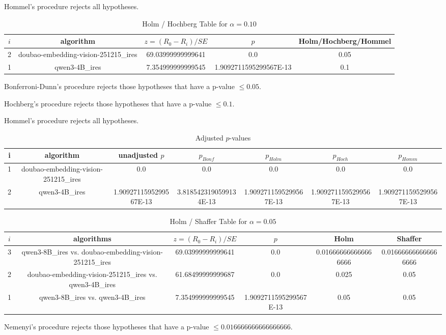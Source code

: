 \documentclass[a4paper,10pt]{article}
\begin{document}
\begin{landscape}
Hommel's procedure rejects all hypotheses.


\begin{table}[!htp]
\centering\tiny
\caption{Holm / Hochberg Table for $\alpha=0.10$}
\begin{tabular}{ccccc}
$i$&algorithm&$z=(R_0 - R_i)/SE$&$p$&Holm/Hochberg/Hommel\\
\hline
2&doubao-embedding-vision-251215_ires&69.03999999999641&0.0&0.05\\
1&qwen3-4B_ires&7.354999999999545&1.9092711595299567E-13&0.1\\
\hline
\end{tabular}
\end{table}
Bonferroni-Dunn's procedure rejects those hypotheses that have a p-value $\le0.05$.


Hochberg's procedure rejects those hypotheses that have a p-value $\le0.1$.


Hommel's procedure rejects all hypotheses.


\begin{table}[!htp]
\centering\tiny
\caption{Adjusted $p$-values}
\begin{tabular}{ccccccc}
i&algorithm&unadjusted $p$&$p_{Bonf}$&$p_{Holm}$&$p_{Hoch}$&$p_{Homm}$\\
\hline
1&doubao-embedding-vision-251215_ires&0.0&0.0&0.0&0.0&0.0\\
2&qwen3-4B_ires&1.9092711595299567E-13&3.8185423190599134E-13&1.9092711595299567E-13&1.9092711595299567E-13&1.9092711595299567E-13\\
\hline
\end{tabular}
\end{table}

\begin{table}[!htp]
\centering\tiny
\caption{Holm / Shaffer Table for $\alpha=0.05$}
\begin{tabular}{cccccc}
$i$&algorithms&$z=(R_0 - R_i)/SE$&$p$&Holm&Shaffer\\
\hline
3&qwen3-8B_ires vs. doubao-embedding-vision-251215_ires&69.03999999999641&0.0&0.016666666666666666&0.016666666666666666\\2&doubao-embedding-vision-251215_ires vs. qwen3-4B_ires&61.68499999999687&0.0&0.025&0.05\\1&qwen3-8B_ires vs. qwen3-4B_ires&7.354999999999545&1.9092711595299567E-13&0.05&0.05\\\hline
\end{tabular}
\end{table}
Nemenyi's procedure rejects those hypotheses that have a p-value $\le0.016666666666666666$.



\end{landscape}
\end{document}
